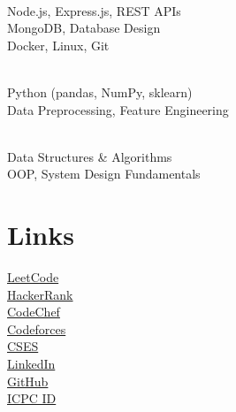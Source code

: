 \documentclass[]{deedy-resume-openfont}
\begin{document}
\begin{minipage}[t]{0.33\textwidth}
\textbf{} \\
\textbullet{} Node.js, Express.js, REST APIs \\
\textbullet{} MongoDB, Database Design \\
\textbullet{} Docker, Linux, Git \\
\sectionsep

\textbf{} \\
\textbullet{} Python (pandas, NumPy, sklearn) \\
\textbullet{} Data Preprocessing, Feature Engineering \\
\sectionsep

\textbf{} \\
\textbullet{} Data Structures \& Algorithms \\
\textbullet{} OOP, System Design Fundamentals
\sectionsep


\section{Links}
\href{https://leetcode.com/u/ishtiaque-9/}{LeetCode} \\
\href{https://www.hackerrank.com/profile/kazimdarifishti1}{HackerRank} \\
\href{https://www.codechef.com/users/mdishtiaque}{CodeChef} \\
\href{https://codeforces.com/profile/depndbl.org}{Codeforces} \\
\href{https://cses.fi/user/139477}{CSES} \\
\href{https://www.linkedin.com/in/ishtiaque9833/}{LinkedIn} \\
\href{https://github.com/mohammad-ishtiaque}{GitHub} \\
\href{https://icpc.global/ICPCID/RLC05PF9JJRM}{ICPC ID}
\sectionsep





\end{minipage}
\end{document}
